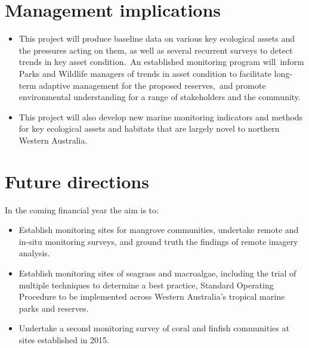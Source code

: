 \documentclass[version=last,
    paper=a4, %
    10pt, %
    usenames,
    dvipsnames,
    oneside, %
    headings=openany, %
    DIV=15 %
]{scrbook}
\begin{document}
\section*{Management implications}
\begin{itemize}
\itemsep1pt\parskip0pt
\item
  This project will produce baseline data on various key ecological
  assets and the pressures acting on them, as well as several recurrent
  surveys to detect trends in key asset condition.~An established
  monitoring program will~inform Parks and Wildlife managers of trends
  in asset condition to facilitate long-term adaptive management for the
  proposed reserves,~and promote environmental understanding for a range
  of stakeholders and the community.
\item
  This project will also develop new marine monitoring indicators and
  methods for key ecological assets and habitats that are largely novel
  to northern Western Australia.~
\end{itemize}



\section*{Future directions}
In the coming financial year the aim is to:

\begin{itemize}
\itemsep1pt\parskip0pt
\item
  Establish monitoring sites for mangrove communities, undertake remote
  and in-situ monitoring surveys, and ground truth the findings of
  remote imagery analysis.
\item
  Establish monitoring sites of seagrass and macroalgae, including the
  trial of multiple techniques to determine a best practice, Standard
  Operating Procedure to be implemented across Western Australia's
  tropical marine parks and reserves.~
\item
  Undertake a second monitoring survey of coral and finfish communities
  at sites established in 2015.
\end{itemize}



\end{document}
